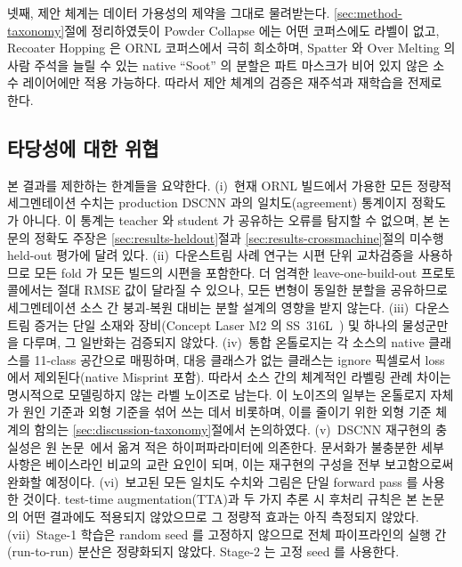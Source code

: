 넷째, 제안 체계는 데이터 가용성의 제약을 그대로 물려받는다.
\ref{sec:method-taxonomy}절에 정리하였듯이 Powder Collapse 에는 어떤
코퍼스에도 라벨이 없고, Recoater Hopping 은 ORNL 코퍼스에서 극히
희소하며, Spatter 와 Over Melting 의 사람 주석을 늘릴 수 있는 native
``Soot'' 의 분할은 파트 마스크가 비어 있지 않은 소수 레이어에만 적용
가능하다. 따라서 제안 체계의 검증은 재주석과 재학습을 전제로 한다.

\subsection{타당성에 대한 위협}
\label{sec:discussion-validity}

본 결과를 제한하는 한계들을 요약한다. (i)~현재 ORNL 빌드에서 가용한 모든
정량적 세그멘테이션 수치는 production DSCNN 과의 일치도(agreement)
통계이지 정확도가 아니다. 이 통계는 teacher 와 student 가 공유하는 오류를
탐지할 수 없으며, 본 논문의 정확도 주장은 \ref{sec:results-heldout}절과
\ref{sec:results-crossmachine}절의 미수행 held-out 평가에 달려 있다.
(ii)~다운스트림 사례 연구는 시편 단위 교차검증을 사용하므로 모든 fold 가
모든 빌드의 시편을 포함한다. 더 엄격한 leave-one-build-out 프로토콜에서는
절대 RMSE 값이 달라질 수 있으나, 모든 변형이 동일한 분할을 공유하므로
세그멘테이션 소스 간 붕괴-복원 대비는 분할 설계의 영향을 받지 않는다.
(iii)~다운스트림 증거는 단일 소재와 장비(Concept Laser M2 의
SS~316L~\cite{ORNL_CoRegistered_Dataset}) 및 하나의 물성군만을 다루며, 그
일반화는 검증되지 않았다. (iv)~통합 온톨로지는 각 소스의 native 클래스를
11-class 공간으로 매핑하며, 대응 클래스가 없는 클래스는 ignore 픽셀로서
loss 에서 제외된다(native Misprint 포함). 따라서 소스 간의 체계적인 라벨링
관례 차이는 명시적으로 모델링하지 않는 라벨 노이즈로 남는다. 이 노이즈의
일부는 온톨로지 자체가 원인 기준과 외형 기준을 섞어 쓰는 데서 비롯하며,
이를 줄이기 위한 외형 기준 체계의 함의는 \ref{sec:discussion-taxonomy}절에서
논의하였다.
(v)~DSCNN
재구현의 충실성은 원 논문~\cite{Scime2020DSCNN}에서 옮겨 적은
하이퍼파라미터에 의존한다. 문서화가 불충분한 세부 사항은 베이스라인 비교의
교란 요인이 되며, 이는 재구현의 구성을 전부 보고함으로써 완화할 예정이다.
(vi)~보고된 모든 일치도 수치와 그림은 단일 forward pass 를 사용한
것이다. test-time augmentation(TTA)과 두 가지 추론 시 후처리 규칙은 본
논문의 어떤 결과에도 적용되지 않았으므로 그 정량적 효과는 아직 측정되지
않았다. (vii)~Stage-1 학습은
random seed 를 고정하지 않으므로 전체 파이프라인의 실행 간(run-to-run)
분산은 정량화되지 않았다. Stage-2 는 고정 seed 를 사용한다. 
